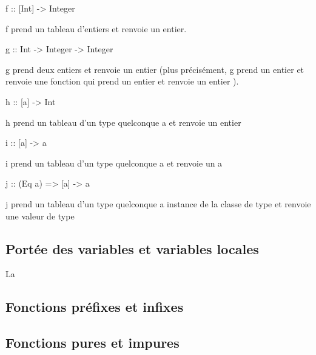 \begin{haskellcode}
f :: [Int] -> Integer
\end{haskellcode}

f prend un tableau d'entiers et renvoie un entier.

\begin{haskellcode}
g :: Int -> Integer -> Integer
\end{haskellcode}

g prend deux entiers et renvoie un entier (plus précisément, g prend un entier et renvoie une fonction qui prend un entier et renvoie un entier ).

\begin{haskellcode}
h :: [a] -> Int
\end{haskellcode}

h prend un tableau d'un type quelconque a  et renvoie un entier

\begin{haskellcode}
i :: [a] -> a
\end{haskellcode}

i prend un tableau d'un type quelconque a et renvoie un a

\begin{haskellcode}
j :: (Eq a) => [a] -> a
\end{haskellcode}

j prend un tableau d'un type quelconque a instance de la classe de type   et renvoie une valeur de type 

\subsection{Portée des variables et variables locales}

La

\subsection{Fonctions préfixes et infixes}

\subsection{Fonctions pures et impures}
